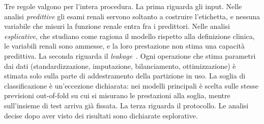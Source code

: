 \documentclass[a4paper, 12pt, oneside]{book}
\begin{document}
Tre regole valgono per l'intera procedura. La prima riguarda gli input. Nelle analisi \emph{predittive} gli esami renali servono soltanto a costruire l'etichetta, e nessuna variabile che misuri la funzione renale entra fra i predittori. Nelle analisi \emph{esplicative}, che studiano come ragiona il modello rispetto alla definizione clinica, le variabili renali sono ammesse, e la loro prestazione non stima una capacità predittiva. La seconda riguarda il \textit{leakage}~\cite{kapoor_leakage_2023}. Ogni operazione che stima parametri dai dati (standardizzazione, imputazione, bilanciamento, ottimizzazione) è stimata solo sulla parte di addestramento della partizione in uso. La soglia di classificazione è un'eccezione dichiarata: nei modelli principali è scelta sulle stesse previsioni out-of-fold su cui si misurano le prestazioni alla soglia, mentre sull'insieme di test arriva già fissata. La terza riguarda il protocollo. Le analisi decise dopo aver visto dei risultati sono dichiarate esplorative.
\end{document}
